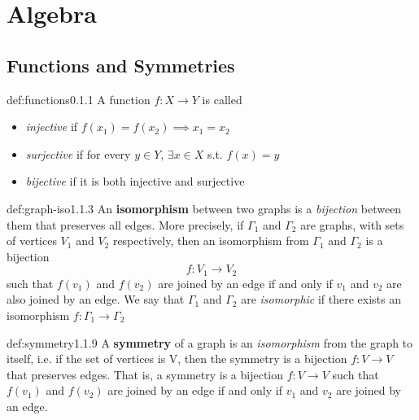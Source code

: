 \documentclass[8pt]{extarticle}
\begin{document}
\section{\huge Algebra}
\begin{multicols}{2}
\subsection{Functions and Symmetries}

\begin{dfn}[Functions]{def:functions}{0.1.1}
A function $f:X\to Y$ is called
\renewcommand\labelitemi{\tiny$\bullet$}
\begin{itemize}
    \setlength\itemsep{0em}
    \item \textit{injective} if $f(x_{1}) = f(x_{2}) \implies x_{1} = x_{{2}}$
    \item \textit{surjective} if for every $y\in Y,\, \exists x\in X$ s.t. $f(x) = y$
    \item \textit{bijective} if it is both injective and surjective
\end{itemize}
\end{dfn}

\begin{dfn}{def:graph-iso}{1.1.3}
    An \textbf{isomorphism} between two graphs is a \textit{bijection} between them that preserves all edges. More precisely, if $\Gamma_{1}$ and $\Gamma_{2}$ are graphs, with sets of vertices $V_{1}$ and $V_{2}$ respectively, then an isomorphism from $\Gamma_{1}$ and $\Gamma_{2}$ is a bijection
    $$f : V_{1}\to V_{2}$$
    such that $f(v_{1})$ and $f(v_{2})$ are joined by an edge if and only if $v_{1}$ and $v_{2}$ are also joined by an edge.
    We say that $\Gamma_{1}$ and $\Gamma_{2}$ are \textit{isomorphic} if there exists an isomorphism $f:\Gamma_{1}\to\Gamma_{2}$
\end{dfn}

\begin{dfn}[Symmetry]{def:symmetry}{1.1.9}
    A \textbf{symmetry} of a graph is an \textit{isomorphism} from the graph to itself, i.e. if the set of vertices is V, then the symmetry is a bijection $f:V\to V$ that preserves edges. That is, a symmetry is a bijection $f:V\to V$ such that $f(v_{1})$ and $f(v_{2})$ are joined by an edge if and only if $v_{1}$ and $v_{2}$ are joined by an edge.
\end{dfn}


\end{multicols}
\end{document}

